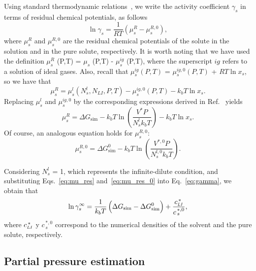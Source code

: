 \documentclass[3p,twocolumn]{elsarticle}
\begin{document}
Using standard thermodynamic relations~\cite{Tester}, we write the activity coefficient $\gamma_s$ in terms of residual chemical potentials, as follows
\begin{equation}
\label{eq:gamma}
\ln \gamma_s = \frac{1}{RT} (\mu_s^R - \mu_s^{R,0}),
\end{equation}
where $\mu_s^R$ and $\mu_s^{R,0}$ are the residual chemical potentials of the solute in the solution and in the pure solute, respectively. It is worth noting that we have used the definition $\mu_s^{R}$ (P,T) = $\mu_s$ (P,T) - $\mu_s^{ig}$ (P,T), where the superscript $ig$ refers to a solution of ideal gases. Also, recall that $\mu_s^{ig} (P,T)$ = $\mu_s^{ig,0} (P,T)$ + $RT \ln x_s$, so we have that
\begin{equation}
\mu_s^R = \mu_s^l(N_s^l,N_{LI},P,T) - \mu_s^{ig,0}(P,T) - k_b T \ln x_s. 
\end{equation}
Replacing $\mu_s^{l}$ and $\mu_s^{ig,0}$ by the corresponding expressions derived in Ref.~\cite{Shirts_2003} yields
\begin{equation}
\label{eq:mu_res}
\mu_s^R = \Delta G_{\text{sim}} - k_b T \ln \left( \frac{V^{\ast} P}{N_s^l k_b T} \right) -  k_b T \ln x_s.
\end{equation}
Of course, an analogous equation holds for $\mu_s^{R,0}$:
\begin{equation}
\label{eq:mu_res_0}
\mu_s^{R,0} = \Delta G_{\text{sim}}^{0} - k_b T \ln \left( \frac{V^{\ast,0} P}{N_s^{l,0} k_b T} \right).
\end{equation}

Considering $N_s^{l}$ = 1, which represents the infinite-dilute condition, and substituting Eqs.~\ref{eq:mu_res} and~\ref{eq:mu_res_0} into Eq.~\ref{eq:gamma}, we  obtain that
\begin{equation}
\ln \gamma^{\infty}_s = \frac{1}{k_b T} \left( \Delta G_{\text{sim}} - \Delta G_{\text{sim}}^{0} \right) + \frac{c_{\scaleto{LI}{4pt}}^{\, \ast}}{c_{\, s}^{\, \ast,0}},
\end{equation}
where $c_{\scaleto{LI}{4pt}}^{\, \ast}$ y $c_{\, s}^{\, \ast,0}$ correspond to the numerical densities of the solvent and the pure solute, respectively.

\subsection*{Partial pressure estimation}
\end{document}
